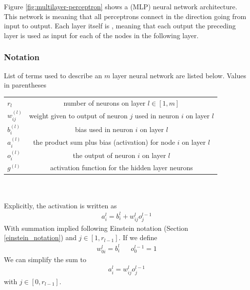 Figure \ref{fig:multilayer-perceptron} shows a  (MLP) neural network architecture. This network is  meaning that all perceptrons connect in the direction going from input to output. Each layer itself is , meaning that each output the preceding layer is used as input for each of the nodes in the following layer.

\subsubsection{Notation}
List of terms used to describe an $m$ layer neural network are listed below\cite{brilliant_backpropagation}. Values in parentheses 
\\
\begin{tabular}{ l c }
  $r_l$ & number of neurons on layer $l\in[1,m]$\\
  $w_{ij}^{(l)}$ & weight given to output of neuron $j$ used in neuron $i$ on layer $l$  \\
  $b_i^{(l)}$ & bias used in neuron $i$ on layer $l$   \\
  $a_i^{(l)}$ & the product sum plus bias (activation) for node $i$ on layer $l$  \\
  $o_i^{(l)}$ & the output of neuron $i$ on layer $l$ \\
  $g^{(l)}$ & activation function for the hidden layer neurons\\
\end{tabular}\\
\\
Explicitly, the activation is written as
\begin{align}
	a_i^l =b_i^l + w_{ij}^lo_j^{l-1}
\end{align}
With summation implied following Einstein notation (Section \ref{einstein_notation}) and $j\in [1,r_{l-1}]$. If we define
\begin{align}
	w^l_{0i}=b_i^l && o_0^{l-1}=1
\end{align}
We can simplify the sum to
\begin{align}\label{nn_activation}
	a_i^l = w_{ij}^lo_j^{l-1}
\end{align}
with $j\in [0,r_{l-1}]$.

